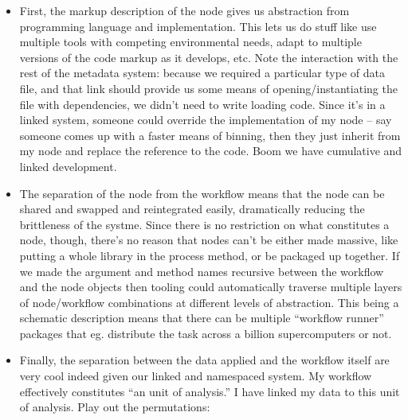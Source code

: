 \documentclass[notoc]{tufte-book}
\begin{document}
\begin{itemize}
\item
  First, the markup description of the node gives us abstraction from
  programming language and implementation. This lets us do stuff like
  use multiple tools with competing environmental needs, adapt to
  multiple versions of the code markup as it develops, etc. Note the
  interaction with the rest of the metadata system: because we required
  a particular type of data file, and that link should provide us some
  means of opening/instantiating the file with dependencies, we didn't
  need to write loading code. Since it's in a linked system, someone
  could override the implementation of my node -- say someone comes up
  with a faster means of binning, then they just inherit from my node
  and replace the reference to the code. Boom we have cumulative and
  linked development.
\item
  The separation of the node from the workflow means that the node can
  be shared and swapped and reintegrated easily, dramatically reducing
  the brittleness of the systme. Since there is no restriction on what
  constitutes a node, though, there's no reason that nodes can't be
  either made massive, like putting a whole library in the process
  method, or be packaged up together. If we made the argument and method
  names recursive between the workflow and the node objects then tooling
  could automatically traverse multiple layers of node/workflow
  combinations at different levels of abstraction. This being a
  schematic description means that there can be multiple ``workflow
  runner'' packages that eg. distribute the task across a billion
  supercomputers or not.
\item
  Finally, the separation between the data applied and the workflow
  itself are very cool indeed given our linked and namespaced system. My
  workflow effectively constitutes ``an unit of analysis.'' I have
  linked my data to this unit of analysis. Play out the permutations:

  \begin{itemize}
  

\end{itemize}
\end{itemize}
\end{document}
